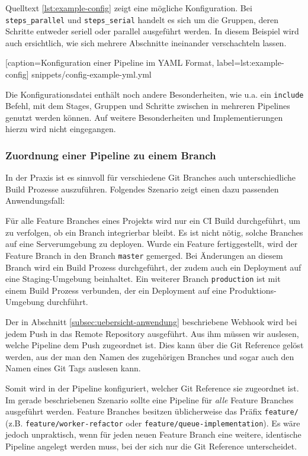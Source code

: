 Quelltext \ref{lst:example-config} zeigt eine mögliche Konfiguration. Bei \texttt{steps\_\allowbreak parallel} und \texttt{steps\_\allowbreak serial} handelt es sich um die Gruppen, deren Schritte entweder seriell oder parallel ausgeführt werden. In diesem Beispiel wird auch ersichtlich, wie sich mehrere Abschnitte ineinander verschachteln lassen.


  [caption={Konfiguration einer Pipeline im YAML Format},
  label={lst:example-config}]
  {snippets/config-example-yml.yml}

Die Konfigurationsdatei enthält noch andere Besonderheiten, wie u.a. ein \texttt{include} Befehl, mit dem Stages, Gruppen und Schritte zwischen in mehreren Pipelines genutzt werden können. Auf weitere Besonderheiten und Implementierungen hierzu wird nicht eingegangen.

\subsubsection{Zuordnung einer Pipeline zu einem Branch}
\label{subsec:git-reference}

In der Praxis ist es sinnvoll für verschiedene Git Branches auch unterschiedliche Build Prozesse auszuführen. Folgendes Szenario zeigt einen dazu passenden Anwendungsfall:

Für alle Feature Branches eines Projekts wird nur ein \ac{CI} Build durchgeführt, um zu verfolgen, ob ein Branch integrierbar bleibt. Es ist nicht nötig, solche Branches auf eine Serverumgebung zu deployen. Wurde ein Feature fertiggestellt, wird der Feature Branch in den Branch \texttt{master} gemerged. Bei Änderungen an diesem Branch wird ein Build Prozess durchgeführt, der zudem auch ein Deployment auf eine Staging-Umgebung beinhaltet. Ein weiterer Branch \texttt{production} ist mit einem Build Prozess verbunden, der ein Deployment auf eine Produktions-Umgebung durchführt.

Der in Abschnitt \ref{subsec:uebersicht-anwendung} beschriebene Webhook wird bei jedem Push in das Remote Repository ausgeführt. Aus ihm müssen wir auslesen, welche Pipeline dem Push zugeordnet ist. Dies kann über die Git Reference gelöst werden, aus der man den Namen des zugehörigen Branches und sogar auch den Namen eines Git Tags auslesen kann.

Somit wird in der Pipeline konfiguriert, welcher Git Reference sie zugeordnet ist. Im gerade beschriebenen Szenario sollte eine Pipeline für \emph{alle} Feature Branches ausgeführt werden. Feature Branches besitzen üblicherweise das Präfix \texttt{feature/} (z.B. \texttt{feature/worker\allowbreak -refactor} oder \texttt{feature/queue\allowbreak -implementation}). Es wäre jedoch unpraktisch, wenn für jeden neuen Feature Branch eine weitere, identische Pipeline angelegt werden muss, bei der sich nur die Git Reference unterscheidet.

